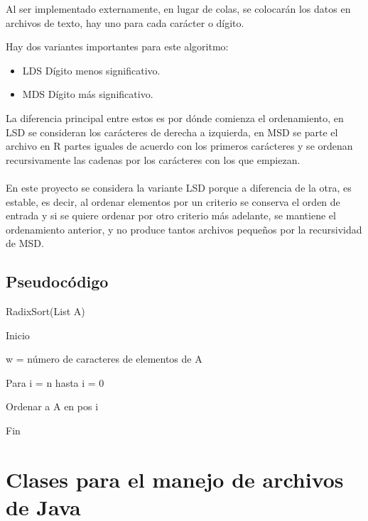 \documentclass[11pt]{article}
\begin{document}
Al ser implementado externamente, en lugar de colas, se colocarán los datos en archivos de texto, hay uno para cada carácter o dígito. 
 
Hay dos variantes importantes para este algoritmo:
\begin{itemize}
\item{LDS}
Dígito menos significativo. 
\item{MDS}
Dígito más significativo.
\end{itemize} 

La diferencia principal entre estos es por dónde comienza el ordenamiento, en LSD se consideran los carácteres de derecha a izquierda, en MSD se parte el archivo en R partes iguales de acuerdo con los primeros carácteres y se ordenan recursivamente las cadenas por los carácteres con los que empiezan. 

\paragraph{}
En este proyecto se considera la variante LSD porque a diferencia de la otra, es estable, es decir, al ordenar elementos por un criterio se conserva el orden de entrada y si se quiere ordenar por otro criterio más adelante, se mantiene el ordenamiento anterior, y no produce tantos archivos pequeños por la recursividad de MSD. 

\subsection{Pseudocódigo}
\begin{description}
\item RadixSort(List A)
\item \quad Inicio
\item
\quad 	w =  número de caracteres de elementos de A
\item
\quad Para i = n hasta i = 0
\item
\quad\quad Ordenar a A en pos i
\item
\quad Fin
\end{description}

\paragraph{}


\section{Clases para el manejo de archivos de Java}
\end{document}
